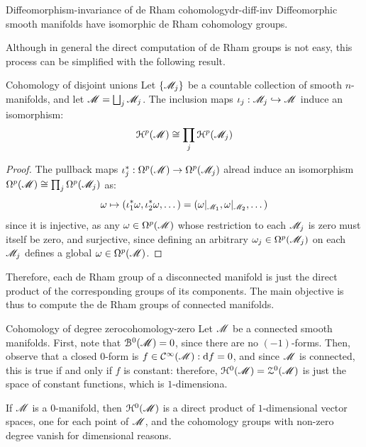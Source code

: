 \begin{propcorollary}{Diffeomorphism-invariance of de Rham cohomology}{dr-diff-inv}
  Diffeomorphic smooth manifolds have isomorphic de Rham cohomology groups.
\end{propcorollary}

Although in general the direct computation of de Rham groups is not easy, this process can be simplified with the following result.

\begin{proposition}{Cohomology of disjoint unions}{}
  Let $ \{\mathscr{M}_j\} $ be a countable collection of smooth $ n $-manifolds, and let $ \mathscr{M} = \bigsqcup_j \mathscr{M}_j $. The inclusion maps $ \iota_j : \mathscr{M}_j \hookrightarrow \mathscr{M} $ induce an isomorphism:
  \begin{equation*}
    \EuScript{H}^{p}(\mathscr{M}) \cong \prod_j \EuScript{H}^{p}(\mathscr{M}_j)
  \end{equation*}
\end{proposition}

\begin{proofbox}
  \begin{proof}
    The pullback maps $ \iota_j^* : \Omega^{p}(\mathscr{M}) \rightarrow \Omega^{p}(\mathscr{M}_j) $ alread induce an isomorphism $ \Omega^{p}(\mathscr{M}) \cong \prod_j \Omega^{p}(\mathscr{M}_j) $ as:
    \begin{equation*}
      \omega \mapsto (\iota_1^* \omega , \iota_2^* \omega , \dots) = (\omega \vert_{\mathscr{M}_1} , \omega \vert_{\mathscr{M}_2} , \dots)
    \end{equation*}
    since it is injective, as any $ \omega \in \Omega^{p}(\mathscr{M}) $ whose restriction to each $ \mathscr{M}_j $ is zero must itself be zero, and surjective, since defining an arbitrary $ \omega_j \in \Omega^{p}(\mathscr{M}_j) $ on each $ \mathscr{M}_j $ defines a global $ \omega \in \Omega^{p}(\mathscr{M}) $.
  \end{proof}
\end{proofbox}

Therefore, each de Rham group of a disconnected manifold is just the direct product of the corresponding groups of its components. The main objective is thus to compute the de Rham groups of connected manifolds.

\begin{example}{Cohomology of degree zero}{cohomology-zero}
  Let $ \mathscr{M} $ be a connected smooth manifolds. First, note that $ \EuScript{B}^{0}(\mathscr{M}) = 0 $, since there are no $ (-1) $-forms. Then, observe that a closed $ 0 $-form is $ f \in \mathcal{C}^{\infty}(\mathscr{M}) : \mathrm{d} f = 0 $, and since $ \mathscr{M} $ is connected, this is true if and only if $ f $ is constant: therefore, $ \EuScript{H}^{0}(\mathscr{M}) = \EuScript{Z}^{0}(\mathscr{M}) $ is just the space of constant functions, which is $ 1 $-dimensiona.

  If $ \mathscr{M} $ is a $ 0 $-manifold, then $ \EuScript{H}^{0}(\mathscr{M}) $ is a direct product of $ 1 $-dimensional vector spaces, one for each point of $ \mathscr{M} $, and the cohomology groups with non-zero degree vanish for dimensional reasons.
\end{example}

